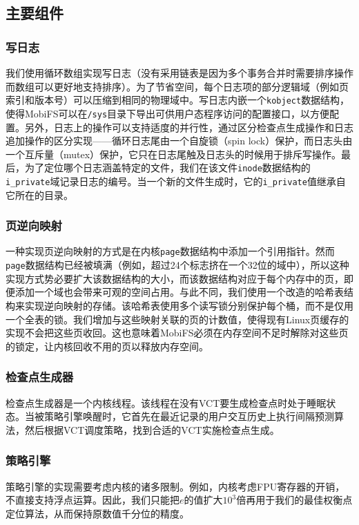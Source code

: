 \subsection{主要组件}
\label{vct:data-struct}

\subsubsection{写日志}
我们使用循环数组实现写日志（没有采用链表是因为多个事务合并时需要排序操作而数组可以更好地支持排序）。为了节省空间，每个日志项的部分逻辑域（例如页索引和版本号）可以压缩到相同的物理域中。写日志内嵌一个\texttt{kobject}数据结构，使得MobiFS可以在\texttt{/sys}目录下导出可供用户态程序访问的配置接口，以方便配置。另外，日志上的操作可以支持适度的并行性，通过区分检查点生成操作和日志追加操作的区分实现——循环日志尾由一个自旋锁（spin lock）保护，而日志头由一个互斥量（mutex）保护，它只在日志尾触及日志头的时候用于排斥写操作。最后，为了定位哪个日志涵盖特定的文件，我们在该文件\texttt{inode}数据结构的\texttt{i\_private}域记录日志的编号。当一个新的文件生成时，它的\texttt{i\_private}值继承自它所在的目录。

\subsubsection{页逆向映射} 
一种实现页逆向映射的方式是在内核\texttt{page}数据结构中添加一个引用指针。然而\texttt{page}数据结构已经被填满（例如，超过24个标志挤在一个32位的域中），所以这种实现方式势必要扩大该数据结构的大小，而该数据结构对应于每个内存中的页，即便添加一个域也会带来可观的空间占用。与此不同，我们使用一个改造的哈希表结构来实现逆向映射的存储。该哈希表使用多个读写锁分别保护每个桶，而不是仅用一个全表的锁。我们增加与这些映射关联的页的计数值，使得现有Linux页缓存的实现不会把这些页收回。这也意味着MobiFS必须在内存空间不足时解除对这些页的锁定，让内核回收不用的页以释放内存空间。

\subsubsection{检查点生成器}
检查点生成器是一个内核线程。该线程在没有VCT要生成检查点时处于睡眠状态。当被策略引擎唤醒时，它首先在最近记录的用户交互历史上执行间隔预测算法，然后根据VCT调度策略，找到合适的VCT实施检查点生成。

\subsubsection{策略引擎}
策略引擎的实现需要考虑内核的诸多限制。例如，内核考虑FPU寄存器的开销，不直接支持浮点运算。因此，我们只能把$e$的值扩大$10^3$倍再用于我们的最佳权衡点定位算法，从而保持原数值千分位的精度。

